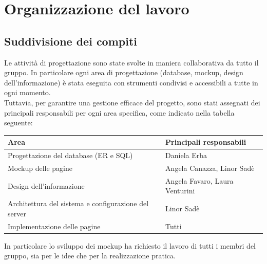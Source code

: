 \section{Organizzazione del lavoro}
\subsection{Suddivisione dei compiti}
Le attività di progettazione sono state svolte in maniera collaborativa da tutto il gruppo. In particolare ogni area di progettazione (database, mockup, design dell'informazione) è stata eseguita con strumenti condivisi e accessibili a tutte in ogni momento. \\
Tuttavia, per garantire una gestione efficace del progetto, sono stati assegnati dei principali responsabili per ogni area specifica, come indicato nella tabella seguente:
\begin{center}
\begin{tabular}{|l|l|}
\hline
\rowcolor{brown}
\color{white}\textbf{Area} &
\color{white}\textbf{Principali responsabili} \\
\hline
\rowcolor{beige}
Progettazione del database (ER e SQL) & Daniela Erba \\
\hline
\rowcolor{beige}
Mockup delle pagine & Angela Canazza, Linor Sadè \\
\hline
\rowcolor{beige}
Design dell'informazione & Angela Favaro, Laura Venturini \\
\hline
\rowcolor{beige}
Architettura del sistema e configurazione del server& Linor Sadè \\
\hline
\rowcolor{beige}
Implementazione delle pagine & Tutti \\
\hline
\end{tabular}
\end{center}
In particolare lo sviluppo dei mockup ha richiesto il lavoro di tutti i membri del gruppo, sia per le idee che per la realizzazione pratica.\\
